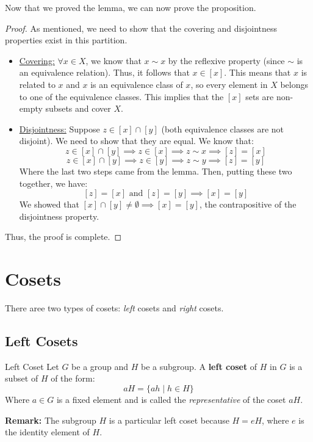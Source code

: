 \documentclass[letterpaper]{article}
\begin{document}
Now that we proved the lemma, we can now prove the proposition. 
\begin{mdframed}
    \begin{proof}
        As mentioned, we need to show that the covering and disjointness properties exist in this partition.
        \begin{itemize}
            \item \underline{Covering:} $\forall x \in X$, we know that $x \sim x$ by the reflexive property (since $\sim$ is an equivalence relation). Thus, it follows that $x \in [x]$. This means that $x$ is related to $x$ and $x$ is an equivalence class of $x$, so every element in $X$ belongs to one of the equivalence classes. This implies that the $[x]$ sets are non-empty subsets and cover $X$.
            \item \underline{Disjointness:} Suppose $z \in [x] \cap [y]$ (both equivalence classes are not disjoint). We need to show that they are equal. We know that:
            \[z \in [x] \cap [y] \implies z \in [x] \implies z \sim x \implies [z] = [x]\]
            \[z \in [x] \cap [y] \implies z \in [y] \implies z \sim y \implies [z] = [y]\]
            Where the last two steps came from the lemma. Then, putting these two together, we have:
            \[[z] = [x] \text{ and } [z] = [y] \implies [x] = [y]\]
            We showed that $[x] \cap [y] \neq \emptyset \implies [x] = [y]$, the contrapositive of the disjointness property. 
        \end{itemize}
        Thus, the proof is complete. 
    \end{proof}
\end{mdframed}











\newpage 
\section{Cosets}
There aree two types of cosets: \emph{left} cosets and \emph{right} cosets. 

\subsection{Left Cosets}
\begin{definition}{Left Coset}{}
    Let $G$ be a group and $H$ be a subgroup. A \textbf{left coset} of $H$ in $G$ is a subset of $H$ of the form:  
    \[aH = \{ah \mid h \in H\}\]
    Where $a \in G$ is a fixed element and is called the \emph{representative} of the coset $aH$. 
\end{definition}
\textbf{Remark:} The subgroup $H$ is a particular left coset because $H = eH$, where $e$ is the identity element of $H$. 
\end{document}

